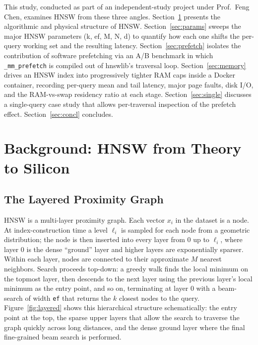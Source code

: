 \documentclass[conference]{IEEEtran}
\begin{document}
This study, conducted as part of an independent-study project under
Prof.\ Feng Chen, examines HNSW from these three angles. Section~\ref{sec:bg}
presents the algorithmic and physical structure of HNSW.
Section~\ref{sec:params} sweeps the major HNSW parameters (k, ef, M, N, d) to
quantify how each one shifts the per-query working set and the resulting
latency. Section~\ref{sec:prefetch} isolates the contribution of software
prefetching via an A/B benchmark in which \texttt{\_mm\_prefetch} is
compiled out of hnswlib's traversal loop. Section~\ref{sec:memory} drives an
HNSW index into progressively tighter RAM caps inside a Docker container,
recording per-query mean and tail latency, major page faults, disk I/O, and
the RAM-vs-swap residency ratio at each stage. Section~\ref{sec:single}
discusses a single-query case study that allows per-traversal inspection of
the prefetch effect. Section~\ref{sec:concl} concludes.

\section{Background: HNSW from Theory to Silicon}
\label{sec:bg}

\subsection{The Layered Proximity Graph}
HNSW is a multi-layer proximity graph. Each vector $x_i$ in the dataset is a
node. At index-construction time a level $\ell_i$ is sampled for each node
from a geometric distribution; the node is then inserted into every layer
from 0 up to $\ell_i$, where layer 0 is the dense ``ground'' layer and
higher layers are exponentially sparser. Within each layer, nodes are
connected to their approximate $M$ nearest neighbors. Search proceeds
top-down: a greedy walk finds the local minimum on the topmost layer,
then descends to the next layer using the previous layer's local minimum
as the entry point, and so on, terminating at layer 0 with a beam-search of
width \texttt{ef} that returns the $k$ closest nodes to the query.
Figure~\ref{fig:layered} shows this hierarchical structure schematically:
the entry point at the top, the sparse upper layers that allow the search
to traverse the graph quickly across long distances, and the dense ground
layer where the final fine-grained beam search is performed.
\end{document}
